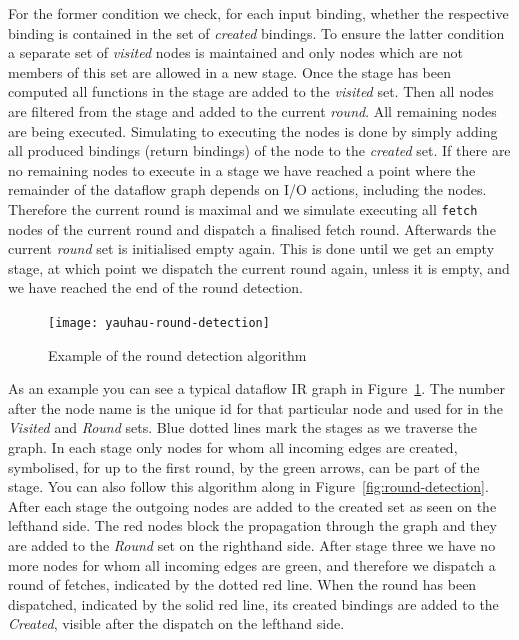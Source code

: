 For the former condition we check, for each input binding, whether the respective binding is contained in the set of \emph{created} bindings.
To ensure the latter condition a separate set of \emph{visited} nodes is maintained and only nodes which are not members of this set are allowed in a new stage.
Once the stage has been computed all functions in the stage are added to the \emph{visited} set.
Then all \fetch{} nodes are filtered from the stage and added to the current \emph{round}.
All remaining nodes are being executed.
Simulating to executing the nodes is done by simply adding all produced bindings (return bindings) of the node to the \emph{created} set.
If there are no remaining nodes to execute in a stage we have reached a point where the remainder of the dataflow graph depends on I/O actions, including the \fetch{} nodes.
Therefore the current round is maximal and we simulate executing all \texttt{fetch} nodes of the current round and dispatch a finalised fetch round.
Afterwards the current \emph{round} set is initialised empty again.
This is done until we get an empty stage, at which point we dispatch the current round again, unless it is empty, and we have reached the end of the round detection.

\begin{figure}
    \texttt{[image: yauhau-round-detection]}
    \caption{Example of the round detection algorithm}
    \label{fig:yauhau-round-detection}
\end{figure}

As an example you can see a typical dataflow IR graph in Figure~\ref{fig:yauhau-round-detection}.
The number after the node name is the unique id for that particular node and used for in the \emph{Visited} and \emph{Round} sets.
Blue dotted lines mark the stages as we traverse the graph.
In each stage only nodes for whom all incoming edges are created, symbolised, for up to the first round, by the green arrows, can be part of the stage.
You can also follow this algorithm along in Figure~\ref{fig:round-detection}.
After each stage the outgoing nodes are added to the created set as seen on the lefthand side.
The red \fetch{} nodes block the propagation through the graph and they are added to the \emph{Round} set on the righthand side.
After stage three we have no more nodes for whom all incoming edges are green, and therefore we dispatch a round of fetches, indicated by the dotted red line.
When the round has been dispatched, indicated by the solid red line, its created bindings are added to the \emph{Created}, visible after the dispatch on the lefthand side.


